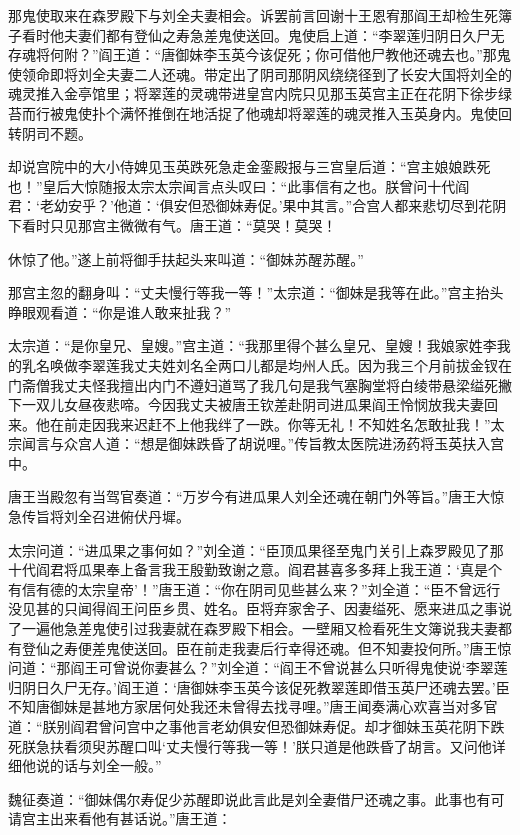 \documentclass[12pt,UTF8]{ctexbook}
\begin{document}
{那鬼使取来在森罗殿下与刘全夫妻相会。诉罢前言回谢十王恩宥那阎王却检生死簿子看时他夫妻们都有登仙之寿急差鬼使送回。鬼使启上道：“李翠莲归阴日久尸无存魂将何附？”阎王道：“唐御妹李玉英今该促死；你可借他尸教他还魂去也。”那鬼使领命即将刘全夫妻二人还魂。带定出了阴司那阴风绕绕径到了长安大国将刘全的魂灵推入金亭馆里；将翠莲的灵魂带进皇宫内院只见那玉英宫主正在花阴下徐步绿苔而行被鬼使扑个满怀推倒在地活捉了他魂却将翠莲的魂灵推入玉英身内。鬼使回转阴司不题。

却说宫院中的大小侍婢见玉英跌死急走金銮殿报与三宫皇后道：“宫主娘娘跌死也！”皇后大惊随报太宗太宗闻言点头叹曰：“此事信有之也。朕曾问十代阎君：‘老幼安乎？’他道：‘俱安但恐御妹寿促。’果中其言。”合宫人都来悲切尽到花阴下看时只见那宫主微微有气。唐王道：“莫哭！莫哭！

休惊了他。”遂上前将御手扶起头来叫道：“御妹苏醒苏醒。”

那宫主忽的翻身叫：“丈夫慢行等我一等！”太宗道：“御妹是我等在此。”宫主抬头睁眼观看道：“你是谁人敢来扯我？”

太宗道：“是你皇兄、皇嫂。”宫主道：“我那里得个甚么皇兄、皇嫂！我娘家姓李我的乳名唤做李翠莲我丈夫姓刘名全两口儿都是均州人氏。因为我三个月前拔金钗在门斋僧我丈夫怪我擅出内门不遵妇道骂了我几句是我气塞胸堂将白绫带悬梁缢死撇下一双儿女昼夜悲啼。今因我丈夫被唐王钦差赴阴司进瓜果阎王怜悯放我夫妻回来。他在前走因我来迟赶不上他我绊了一跌。你等无礼！不知姓名怎敢扯我！”太宗闻言与众宫人道：“想是御妹跌昏了胡说哩。”传旨教太医院进汤药将玉英扶入宫中。

唐王当殿忽有当驾官奏道：“万岁今有进瓜果人刘全还魂在朝门外等旨。”唐王大惊急传旨将刘全召进俯伏丹墀。

太宗问道：“进瓜果之事何如？”刘全道：“臣顶瓜果径至鬼门关引上森罗殿见了那十代阎君将瓜果奉上备言我王殷勤致谢之意。阎君甚喜多多拜上我王道：‘真是个有信有德的太宗皇帝’！”唐王道：“你在阴司见些甚么来？”刘全道：“臣不曾远行没见甚的只闻得阎王问臣乡贯、姓名。臣将弃家舍子、因妻缢死、愿来进瓜之事说了一遍他急差鬼使引过我妻就在森罗殿下相会。一壁厢又检看死生文簿说我夫妻都有登仙之寿便差鬼使送回。臣在前走我妻后行幸得还魂。但不知妻投何所。”唐王惊问道：“那阎王可曾说你妻甚么？”刘全道：“阎王不曾说甚么只听得鬼使说‘李翠莲归阴日久尸无存。’阎王道：‘唐御妹李玉英今该促死教翠莲即借玉英尸还魂去罢。’臣不知唐御妹是甚地方家居何处我还未曾得去找寻哩。”唐王闻奏满心欢喜当对多官道：“朕别阎君曾问宫中之事他言老幼俱安但恐御妹寿促。却才御妹玉英花阴下跌死朕急扶看须臾苏醒口叫‘丈夫慢行等我一等！’朕只道是他跌昏了胡言。又问他详细他说的话与刘全一般。”

魏征奏道：“御妹偶尔寿促少苏醒即说此言此是刘全妻借尸还魂之事。此事也有可请宫主出来看他有甚话说。”唐王道：

}
\end{document}
